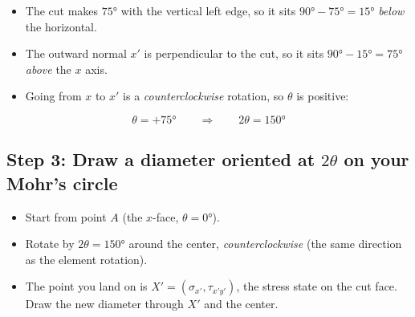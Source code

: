 \documentclass[11pt]{article}
\begin{document}
\noindent
\begin{minipage}[c]{0.45\textwidth}
\centering
{}
\end{minipage}%
\hfill
\begin{minipage}[c]{0.52\textwidth}
\begin{itemize}
  \item The cut makes $\ang{75}$ with the vertical left edge, so it sits
        $\ang{90} - \ang{75} = \ang{15}$ \emph{below} the horizontal.
  \item The outward normal $x'$ is perpendicular to the cut, so it sits
        $\ang{90} - \ang{15} = \ang{75}$ \emph{above} the $x$ axis.
  \item Going from $x$ to $x'$ is a \emph{counterclockwise} rotation, so $\theta$ is
        positive:
\end{itemize}
\[
  \boxed{\theta = +\ang{75}}
  \qquad\Rightarrow\qquad
  \boxed{2\theta = \ang{150}}
\]
\end{minipage}

\subsection*{Step 3: Draw a diameter oriented at $2\theta$ on your Mohr's circle}

\noindent
\begin{minipage}[c]{0.45\textwidth}
\begin{itemize}
  \item Start from point $A$ (the $x$-face, $\theta = \ang{0}$).
  \item Rotate by $2\theta = \ang{150}$ around the center, \emph{counterclockwise}
        (the same direction as the element rotation).
  \item The point you land on is $X' = (\sigma_{x'}, \tau_{x'y'})$, the stress state on
        the cut face. Draw the new diameter through $X'$ and the center.
\end{itemize}
\end{minipage}%
\hfill
\begin{minipage}[c]{0.52\textwidth}
\centering{}
\end{minipage}
\end{document}
